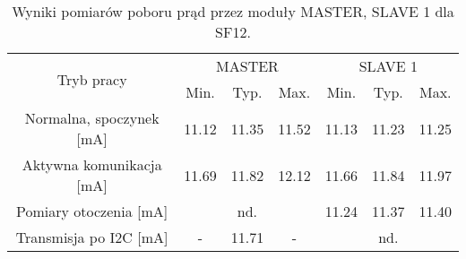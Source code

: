 \renewcommand\theContinuedFloat{\alph{ContinuedFloat}}
\begin{table}[!htbp]
    \ContinuedFloat*
    \centering
    \caption{\label{tab:power-usage-sf12a}Wyniki pomiarów poboru prąd przez moduły MASTER, SLAVE 1 dla SF12.}
    \begin{tabular}{ccccccc}
        \toprule
        \multicolumn{1}{c}{\multirow{2}[4]{*}{Tryb pracy}} & \multicolumn{3}{c}{MASTER} & \multicolumn{3}{c}{SLAVE 1}                                                                                                             \\
        \cmidrule{2-7}                                     & \multicolumn{1}{c}{Min.}   & \multicolumn{1}{c}{Typ.}    & \multicolumn{1}{c}{Max.} & \multicolumn{1}{c}{Min.} & \multicolumn{1}{c}{Typ.} & \multicolumn{1}{c}{Max.} \\
        \midrule
        Normalna, spoczynek [mA]                           & 11.12                      & 11.35                       & 11.52                    & 11.13                    & 11.23                    & 11.25                    \\
        \midrule
        Aktywna komunikacja [mA]                           & 11.69                      & 11.82                       & 12.12                    & 11.66                    & 11.84                    & 11.97                    \\
        \midrule
        Pomiary otoczenia [mA]                             & \multicolumn{3}{c}{nd.}    & 11.24                       & 11.37                    & 11.40                                                                          \\
        \midrule
        Transmisja po I2C [mA]                             & -                          & 11.71                       & -                        & \multicolumn{3}{c}{nd.}                                                        \\
        \bottomrule
    \end{tabular}%
\end{table}%

